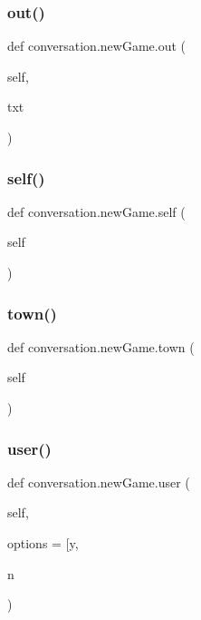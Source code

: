 \subsubsection{\texorpdfstring{out()}{out()}}
{\footnotesize\ttfamily def conversation.\+new\+Game.\+out (\begin{DoxyParamCaption}\item[{}]{self,  }\item[{}]{txt }\end{DoxyParamCaption})}

\mbox{\label{classconversation_1_1newGame_aec466f6f31f9a83b5d0170c60a7060aa}} 
\subsubsection{\texorpdfstring{self()}{self()}}
{\footnotesize\ttfamily def conversation.\+new\+Game.\+self (\begin{DoxyParamCaption}\item[{}]{self }\end{DoxyParamCaption})}

\mbox{\label{classconversation_1_1newGame_a35bc0ac3765a23df7df177e9ebfe53fb}} 
\subsubsection{\texorpdfstring{town()}{town()}}
{\footnotesize\ttfamily def conversation.\+new\+Game.\+town (\begin{DoxyParamCaption}\item[{}]{self }\end{DoxyParamCaption})}

\mbox{\label{classconversation_1_1newGame_a789b54cc0bfabe1934df298c6574dd93}} 
\subsubsection{\texorpdfstring{user()}{user()}}
{\footnotesize\ttfamily def conversation.\+new\+Game.\+user (\begin{DoxyParamCaption}\item[{}]{self,  }\item[{}]{options = {\ttfamily \mbox{[}\textquotesingle{}y\textquotesingle{}},  }\item[{}]{n }\end{DoxyParamCaption})}

